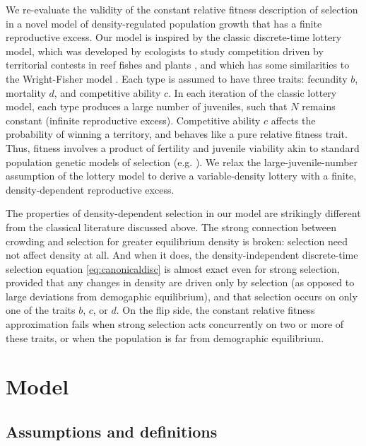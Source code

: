 \documentclass[12pt]{article}
\begin{document}
We re-evaluate the validity of the constant relative fitness description of selection in a novel model of density-regulated population growth that has a finite reproductive excess. Our model is inspired by the classic discrete-time lottery model, which was developed by ecologists to study competition driven by territorial contests in reef fishes and plants \citep{sale_77,chesson_1981}, and which has some similarities to the Wright-Fisher model \citep{svardal_2015}. Each type is assumed to have three traits: fecundity $b$, mortality $d$, and competitive ability $c$. In each iteration of the classic lottery model, each type produces a large number of juveniles, such that $N$ remains constant (infinite reproductive excess). Competitive ability $c$ affects the probability of winning a territory, and behaves like a pure relative fitness trait. Thus, fitness involves a product of fertility and juvenile viability akin to standard population genetic models of selection (e.g. \citealt[pp. 185]{crow_1970}). We relax the large-juvenile-number assumption of the lottery model to derive a variable-density lottery with a finite, density-dependent reproductive excess. 

The properties of density-dependent selection in our model are strikingly different from the classical literature discussed above. The strong connection between crowding and selection for greater equilibrium density is broken: selection need not affect density at all. And when it does, the density-independent discrete-time selection equation \eqref{eq:canonicaldisc} is almost exact even for strong selection, provided that any changes in density are driven only by selection (as opposed to large deviations from demogaphic equilibrium), and that selection occurs on only one of the traits $b$, $c$, or $d$. On the flip side, the constant relative fitness approximation fails when strong selection acts concurrently on two or more of these traits, or when the population is far from demographic equilibrium.

\section*{Model}\label{sec:model}

\subsection*{Assumptions and definitions} 
\end{document}
